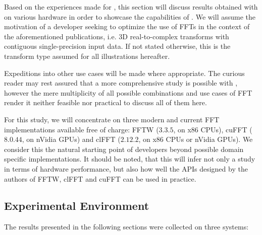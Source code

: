 Based on the experiences made for \cite{preibisch2014efficient, schmid2015real}, this section will discuss results obtained with \gearshifft{} on various hardware in order to showcase the capabilities of \gearshifft{}. We will assume the motivation of a developer seeking to optimize the use of FFTs in the context of the aforementioned publications, i.e. 3D real-to-complex transforms with contiguous single-precision input data. If not stated otherwise, this is the transform type assumed for all illustrations hereafter. 

Expeditions into other use cases will be made where appropriate. The curious reader may rest assured that a more comprehensive study is possible with \gearshifft{}, however the mere multiplicity of all possible combinations and use cases of FFT render it neither feasible nor practical to discuss all of them here.

For this study, we will concentrate on three modern and current FFT implementations available free of charge: FFTW ($3.3.5$, on x86 CPUs), cuFFT ($8.0.44$, on nVidia GPUs) and clFFT ($2.12.2$, on x86 CPUs or nVidia GPUs). We consider this the natural starting point of developers beyond possible domain specific implementations. It should be noted, that this will infer not only a study in terms of hardware performance, but also how well the APIs designed by the authors of FFTW, clFFT and cuFFT can be used in practice. 

\subsection{Experimental Environment}
\label{ssec:env}

The results presented in the following sections were collected on three systems:

